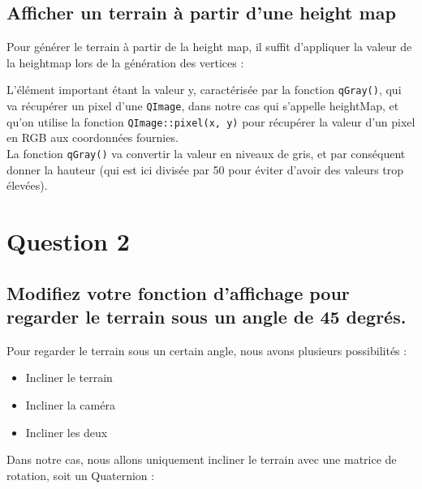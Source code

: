 \documentclass[a4paper,11pt]{report}
\begin{document}
    \subsection{Afficher un terrain à partir d'une height map}
    Pour générer le terrain à partir de la height map, il suffit d'appliquer la valeur de la heightmap lors de la génération des vertices :
        
	L'élément important étant la valeur y, caractérisée par la fonction \texttt{qGray()}, qui va récupérer un pixel d'une \texttt{QImage}, dans notre cas qui s'appelle heightMap, et qu'on utilise la fonction \texttt{QImage::pixel(x, y)} pour récupérer la valeur d'un pixel en RGB aux coordonnées fournies.\\
	La fonction \texttt{qGray()} va convertir la valeur en niveaux de gris, et par conséquent donner la hauteur (qui est ici divisée par 50 pour éviter d'avoir des valeurs trop élevées).
	 
	
	\pagebreak
	\section{Question 2}
	\subsection{Modifiez votre fonction d'affichage pour regarder le terrain sous un angle de 45 degrés.}
		Pour regarder le terrain sous un certain angle, nous avons plusieurs possibilités :
		\begin{itemize}
			\item Incliner le terrain
			\item Incliner la caméra
			\item Incliner les deux
		\end{itemize}
		
		Dans notre cas, nous allons uniquement incliner le terrain avec une matrice de rotation, soit un Quaternion :
		
		
\end{document}

